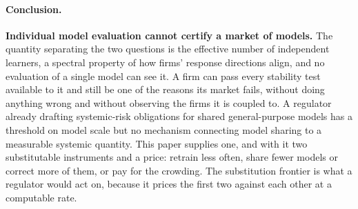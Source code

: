 \documentclass{article}
\theoremstyle{plain}
\theoremstyle{definition}
\begin{document}
\paragraph{Conclusion.}
\textbf{Individual model evaluation cannot certify a market of models.} The quantity separating the two questions is the effective number of independent learners, a spectral property of how firms' response directions align, and no evaluation of a single model can see it. A firm can pass every stability test available to it and still be one of the reasons its market fails, without doing anything wrong and without observing the firms it is coupled to. A regulator already drafting systemic-risk obligations for shared general-purpose models has a threshold on model scale but no mechanism connecting model sharing to a measurable systemic quantity. This paper supplies one, and with it two substitutable instruments and a price: retrain less often, share fewer models or correct more of them, or pay for the crowding. The substitution frontier is what a regulator would act on, because it prices the first two against each other at a computable rate.
\end{document}
